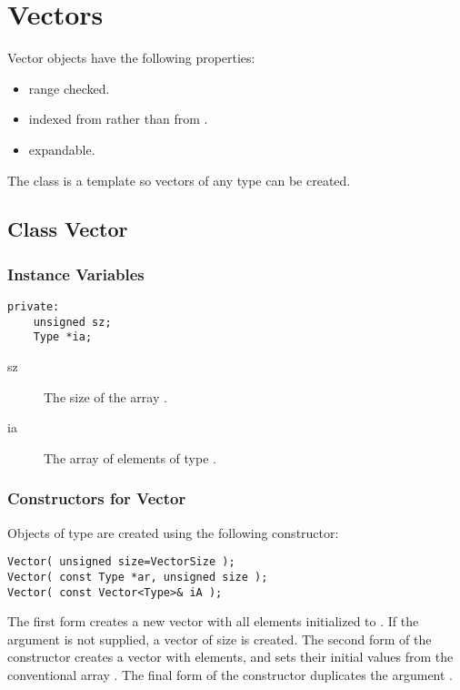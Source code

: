 % 
% 
\section{Vectors}
\label{sec:vector}

Vector objects have the following properties:\begin{itemize}
\item range checked.
\item indexed from  rather than from . 
\item expandable.
\end{itemize}
The  class is a template so
vectors of any type can be created.  

\subsection{Class Vector}

\subsubsection{Instance Variables}

\begin{verbatim}
private:
    unsigned sz;
    Type *ia;
\end{verbatim}

\begin{description}
\item[sz] \texonly{---} The size of the array .
\item[ia] \texonly{---} The array of elements of type .
\end{description}
\subsubsection{Constructors for Vector}
\label{sec:vector-constructors}

Objects of type  are created using the following
constructor:

\begin{verbatim}
Vector( unsigned size=VectorSize );
Vector( const Type *ar, unsigned size );
Vector( const Vector<Type>& iA );
\end{verbatim}

The first form creates a new vector with all  elements
initialized to .  If the argument  is not supplied,
a vector of size  is created.  The second form of the
constructor creates a vector with  elements, and sets their
initial values from the conventional array .  The final form
of the constructor duplicates the argument .

